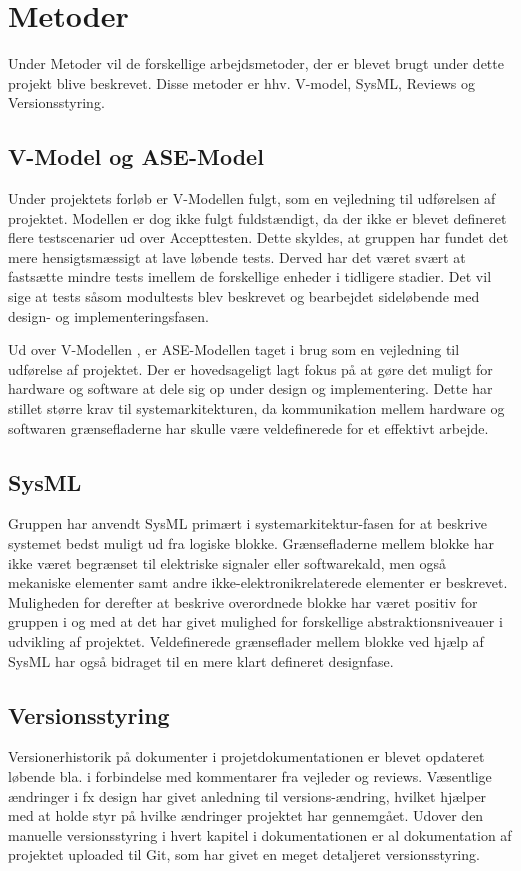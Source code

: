 \section{Metoder} \label{ch:Metoder}

Under Metoder vil de forskellige arbejdsmetoder, der er blevet brugt under dette projekt blive beskrevet. Disse metoder er hhv. V-model, SysML, Reviews og Versionsstyring.

\subsection{V-Model og ASE-Model} 
Under projektets forløb er V-Modellen fulgt, som en vejledning til udførelsen af projektet. Modellen er dog ikke fulgt fuldstændigt, da der ikke er blevet defineret flere testscenarier ud over Accepttesten. Dette skyldes, at gruppen har fundet det mere hensigtsmæssigt at lave løbende tests. Derved har det været svært at fastsætte mindre tests imellem de forskellige enheder i tidligere stadier. Det vil sige at tests såsom modultests blev beskrevet og bearbejdet sideløbende med design- og implementeringsfasen.

Ud over V-Modellen \cite{lib:T-006}, er ASE-Modellen \cite{lib:vejledning} taget i brug som en vejledning til udførelse af projektet. Der er hovedsageligt lagt fokus på at gøre det muligt for hardware og software at dele sig op under design og implementering. Dette har stillet større krav til systemarkitekturen, da kommunikation mellem hardware og softwaren grænsefladerne har skulle være veldefinerede for et effektivt arbejde.

\subsection{SysML}
Gruppen har anvendt SysML primært i systemarkitektur-fasen for at beskrive systemet bedst muligt ud fra logiske blokke.
Grænsefladerne mellem blokke har ikke været begrænset til elektriske signaler eller softwarekald, men også mekaniske elementer samt andre ikke-elektronikrelaterede elementer er beskrevet. 
Muligheden for derefter at beskrive overordnede blokke har været positiv for gruppen i og med at det har givet mulighed for forskellige abstraktionsniveauer i udvikling af projektet.
Veldefinerede grænseflader mellem blokke ved hjælp af SysML har også bidraget til en mere klart defineret designfase.

\subsection{Versionsstyring}
Versionerhistorik på dokumenter i projetdokumentationen er blevet opdateret løbende bla. i forbindelse med kommentarer fra vejleder og reviews. Væsentlige ændringer i fx design har givet anledning til versions-ændring, hvilket hjælper med at holde styr på hvilke ændringer projektet har gennemgået.
Udover den manuelle versionsstyring i hvert kapitel i dokumentationen er al dokumentation af projektet uploaded til Git, som har givet en meget detaljeret versionsstyring.

